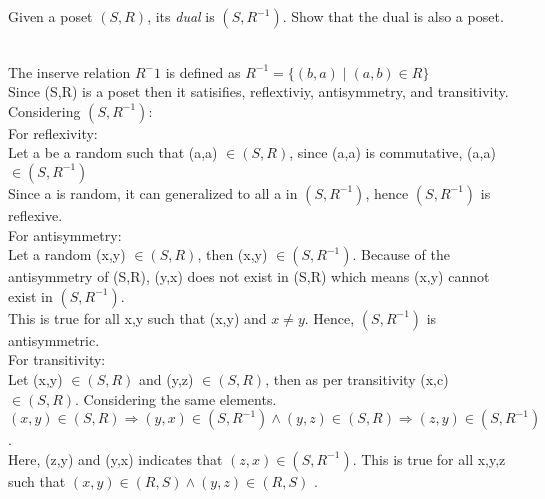 \documentclass[addpoints]{exam}
\begin{document}
\begin{questions}
\begin{solution}
  \end{solution}
  
\question[5] Given a poset $(S, R)$, its \textit{dual} is $(S,R^{-1})$. Show that the dual is also a poset. 
  \begin{solution}\\
    The inserve relation $R^-1$ is defined as $R^{-1} = \{(b,a) \mid (a,b) \in R\}$\\
    Since (S,R) is a poset then it satisifies, reflextiviy, antisymmetry, and transitivity. \\
    Considering $(S,R^{-1})$:\\
    For reflexivity:
    \\Let a be a random such that (a,a) $\in (S,R)$, since (a,a) is commutative, (a,a) $\in (S,R^{-1})$\\
    Since a is random, it can generalized to all a in $(S,R^{-1})$, hence $(S,R^{-1})$ is reflexive.
    \\For antisymmetry:
    \\Let a random (x,y) $\in (S,R)$, then (x,y) $\in (S,R^{-1})$. Because of the antisymmetry of (S,R), (y,x) does not exist in (S,R) which means (x,y) cannot exist in $(S,R^{-1})$.
    \\This is true for all x,y such that (x,y) and $x \neq y$. Hence, $(S,R^{-1})$ is antisymmetric.
    \\For transitivity:
    \\Let (x,y) $\in (S,R)$ and (y,z) $\in (S,R)$, then as per transitivity (x,c) $\in (S,R)$. Considering the same elements. $(x,y) \in (S,R) \Rightarrow (y,x) \in (S,R^{-1}) \land (y,z) \in (S,R) \Rightarrow (z,y) \in (S,R^{-1})$.
    \\Here, (z,y) and (y,x) indicates that $(z,x) \in (S,R^{-1})$. This is true for all x,y,z such that $(x,y) \in (R,S) \land (y,z) \in (R,S) $  .    
  \end{solution}
  

\end{questions}
\end{document}
